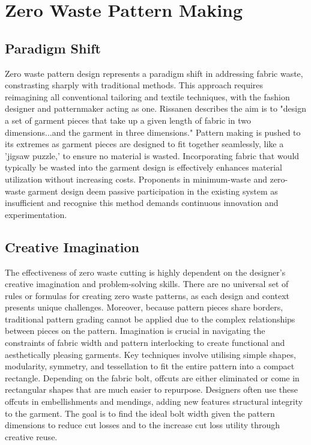 \section{Zero Waste Pattern Making}
\subsection{Paradigm Shift}
Zero waste pattern design represents a paradigm shift in addressing fabric waste, constrasting sharply with traditional methods. This approach requires reimagining all conventional tailoring and textile techniques, with the fashion designer and patternmaker acting as one. Rissanen describes the aim is to "design a set of garment pieces that take up a given length of fabric in two dimensions...and the garment in three dimensions." Pattern making is pushed to its extremes as garment pieces are designed to fit together seamlessly, like a 'jigsaw puzzle,' to ensure no material is wasted. Incorporating fabric that would typically be wasted into the garment design is effectively enhances material utilization without increasing costs. Proponents in minimum-waste and zero-waste garment design deem passive participation in the existing system as insufficient and recognise this method demands continuous innovation and experimentation.

\subsection{Creative Imagination}
The effectiveness of zero waste cutting is highly dependent on the designer's creative imagination and problem-solving skills. There are no universal set of rules or formulas for creating zero waste patterns, as each design and context presents unique challenges. Moreover, because pattern pieces share borders, traditional pattern grading cannot be applied due to the complex relationships between pieces on the pattern. Imagination is crucial in navigating the constraints of fabric width and pattern interlocking to create functional and aesthetically pleasing garments. Key techniques involve utilising simple shapes, modularity, symmetry, and tessellation to fit the entire pattern into a compact rectangle. Depending on the fabric bolt, offcuts are either eliminated or come in rectangular shapes that are much easier to repurpose. Designers often use these offcuts in embellishments and mendings, adding new features structural integrity to the garment. The goal is to find the ideal bolt width given the pattern dimensions to reduce cut losses and to the increase cut loss utility through creative reuse.

